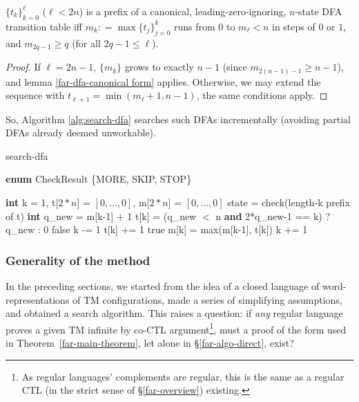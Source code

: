 \begin{corollary}
    $\{t_k\}_{k=0}^\ell$ ($\ell<2n$) is a prefix of a canonical, leading-zero-ignoring, $n$-state DFA transition table iff
    $m_k \mathrel{\mathop:}= \max\{t_j\}_{j=0}^k$ runs from $0$ to $m_\ell<n$ in steps of $0$ or $1$, and $m_{2q-1}\ge q$ (for all $2q - 1 \le \ell$).
\end{corollary}
\begin{proof}
    If $\ell=2n-1$, $\{m_k\}$ grows to exactly $n-1$ (since $m_{2(n-1)-1}\ge n-1$), and lemma \ref{far-dfa-canonical form} applies.
    Otherwise, we may extend the sequence with $t_{\ell+1}=\min(m_\ell+1,n-1)$, the same conditions apply.
\end{proof}

So, Algorithm \ref{alg:search-dfa} searches such DFAs incrementally (avoiding partial DFAs already deemed unworkable).

\begin{algorithm}
    \caption{{\sc search-dfa}}\label{alg:search-dfa}

    \begin{algorithmic}[1]
        \State \textbf{enum} CheckResult \{MORE, SKIP, STOP\}
        \Statex

        \State \textbf{int} k = 1, t[$2*n$] = $[0,\ldots,0]$, m[$2*n$] = $[0,\ldots,0]$
        \Loop
        \State state = check(length-k prefix of t)
        \State \textbf{int} q\_new = m[k-1] + 1
        \State t[k] = (q\_new $<$ \textrm{n} \textbf{and} 2*q\_new-1 == k) ? q\_new : 0
        \Repeat
        \Return false
        \EndIf
        \State k -= 1
        \State t[k] += 1
        \Else\;\Return true
        \EndIf
        \State m[k] = max(m[k-1], t[k])
        \State k += 1
        \EndLoop
        \EndProcedure

    \end{algorithmic}
\end{algorithm}


\subsubsection{Generality of the method}
In the preceding sections, we started from the idea of a closed language of word-representations of TM configurations, made a series of simplifying assumptions, and obtained a search algorithm.
This raises a question: if \emph{any} regular language proves a given TM infinite by co-CTL argument\footnote{
    As regular languages' complements are regular, this is the same as a regular CTL (in the strict sense of \S\ref{far-overview}) existing.
},
must a proof of the form used in Theorem~\ref{far-main-theorem}, let alone in \S\ref{far-algo-direct}, exist?

